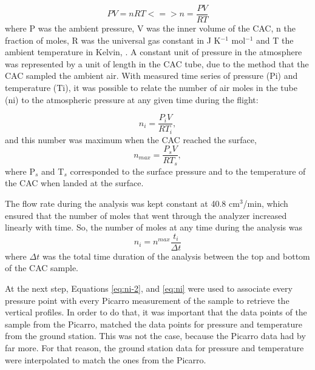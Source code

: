 \begin{equation}
    PV = nRT <=> n = \frac{PV}{RT}
    \label{eq:idealgaslaw}
\end{equation}
where P was the ambient pressure, V was the inner volume of the CAC, n the fraction of moles, R was the universal gas constant in J K$^{-1}$ mol$^{-1}$ and T the ambient temperature in Kelvin, \cite{Membrive}. 
A constant unit of pressure in the atmosphere was represented by a unit of length in the CAC tube, due to the method that the CAC sampled the ambient air.
With measured time series of pressure (Pi) and temperature (Ti), it was possible to relate the number of air moles in the tube (ni) to the atmospheric pressure at any given time during the flight:

\begin{equation}
    n_i =\frac{P_i V}{R T_i},
    \label{eq:ni-2}
\end{equation} 
and this number was maximum when the CAC reached the surface,
\begin{equation}
    n_{max} =\frac{P_s V}{R T_s},
    \label{eq:n-max}
\end{equation} 
where P$_s$ and T$_s$ corresponded to the surface pressure and to the
temperature of the CAC when landed at the surface.

The flow rate during the analysis was kept constant at 40.8 cm$^3$/min, which ensured that the  number of moles that went through the analyzer increased linearly with time. So, the number of moles at any time during the analysis was
\begin{equation}
    n_i = n^{max}\frac{t_i}{\Delta t}
    \label{eq:ni}
\end{equation}
where $\Delta t$ was the total time duration of the analysis between the top and bottom of the CAC sample.   

At the next step, Equations \ref{eq:ni-2}, and \ref{eq:ni} were used to associate every pressure point with every Picarro measurement of the sample to retrieve the vertical profiles.
In order to do that, it was important that the data points of the sample from the Picarro, matched the data points for pressure and temperature from the ground station. This was not the case, because the Picarro data had by far more. For that reason, the ground station data for pressure and temperature were interpolated to match the ones from the Picarro.

